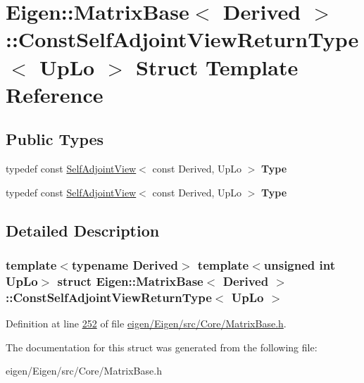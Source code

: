 \hypertarget{struct_eigen_1_1_matrix_base_1_1_const_self_adjoint_view_return_type}{}\section{Eigen\+:\+:Matrix\+Base$<$ Derived $>$\+:\+:Const\+Self\+Adjoint\+View\+Return\+Type$<$ Up\+Lo $>$ Struct Template Reference}
\label{struct_eigen_1_1_matrix_base_1_1_const_self_adjoint_view_return_type}
\subsection*{Public Types}
\begin{DoxyCompactItemize}
\item 
\mbox{\label{struct_eigen_1_1_matrix_base_1_1_const_self_adjoint_view_return_type_ac13928d91344ce53f99519d53299348c}} 
typedef const \hyperlink{group___core___module_class_eigen_1_1_self_adjoint_view}{Self\+Adjoint\+View}$<$ const Derived, Up\+Lo $>$ {\bfseries Type}
\item 
\mbox{\label{struct_eigen_1_1_matrix_base_1_1_const_self_adjoint_view_return_type_ac13928d91344ce53f99519d53299348c}} 
typedef const \hyperlink{group___core___module_class_eigen_1_1_self_adjoint_view}{Self\+Adjoint\+View}$<$ const Derived, Up\+Lo $>$ {\bfseries Type}
\end{DoxyCompactItemize}


\subsection{Detailed Description}
\subsubsection*{template$<$typename Derived$>$\newline
template$<$unsigned int Up\+Lo$>$\newline
struct Eigen\+::\+Matrix\+Base$<$ Derived $>$\+::\+Const\+Self\+Adjoint\+View\+Return\+Type$<$ Up\+Lo $>$}



Definition at line \hyperlink{eigen_2_eigen_2src_2_core_2_matrix_base_8h_source_l00252}{252} of file \hyperlink{eigen_2_eigen_2src_2_core_2_matrix_base_8h_source}{eigen/\+Eigen/src/\+Core/\+Matrix\+Base.\+h}.



The documentation for this struct was generated from the following file\+:\begin{DoxyCompactItemize}
\item 
eigen/\+Eigen/src/\+Core/\+Matrix\+Base.\+h\end{DoxyCompactItemize}
